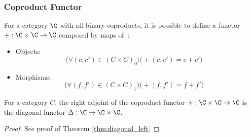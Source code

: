 \subsubsection{Coproduct Functor}
  \begin{definition}
    For a category $\C$ with all binary coproducts, it is possible to define a
    functor $+:\C\times \C \to \C$ composed by maps
    of~\parencite[p.~61]{awodey:category_theory}:
    \begin{itemize}
      \item Objects:
        \[\big(\forall (c,c')\in (C\times C)_0\big)
          \big(+(c, c') = c+ c'\big)\]
      \item Morphisms:
        \[\big(\forall (f, f')\in (C\times C)_1\big)
          \big(+(f, f') = f+ f'\big)\]
    \end{itemize}
  \end{definition}

  \begin{theorem}
    For a category $C$, the right adjoint of the coproduct functor $+: \C\times
    \C\to \C$ is the diagonal functor $\Delta:\C\to \C\times \C$.

    \begin{proof}
      See proof of Theorem \ref{thm:diagonal_left}
    \end{proof}
  \end{theorem}